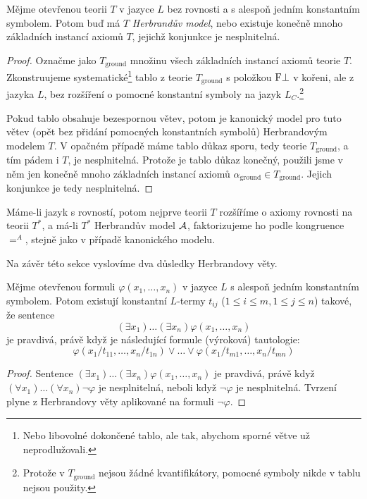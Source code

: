 \begin{theorem}
Mějme otevřenou teorii $T$ v jazyce $L$ bez rovnosti a s alespoň jedním konstantním symbolem. Potom buď má $T$ \emph{Herbrandův model}, nebo existuje konečně mnoho základních instancí axiomů $T$, jejichž konjunkce je nesplnitelná.
\end{theorem}
\begin{proof}
Označme jako $T_\text{ground}$ množinu všech základních instancí axiomů teorie $T$. Zkonstruujeme systematické\footnote{Nebo libovolné dokončené tablo, ale tak, abychom sporné větve už neprodlužovali.} tablo z teorie $T_\text{ground}$ s položkou $\mathrm{F}\bot$ v kořeni, ale z jazyka $L$, bez rozšíření o pomocné konstantní symboly na jazyk $L_C$.\footnote{Protože v $T_\text{ground}$ nejsou žádné kvantifikátory, pomocné symboly nikde v tablu nejsou použity.}

Pokud tablo obsahuje bezespornou větev, potom je kanonický model pro tuto větev (opět bez přidání pomocných konstantních symbolů) Herbrandovým modelem $T$. V opačném případě máme tablo důkaz sporu, tedy teorie $T_\text{ground}$, a tím pádem i $T$, je nesplnitelná. Protože je tablo důkaz konečný, použili jsme v něm jen konečně mnoho základních instancí axiomů $\alpha_\text{ground}\in T_\text{ground}$. Jejich konjunkce je tedy nesplnitelná.
\end{proof}

\begin{remark}
Máme-li jazyk s rovností, potom nejprve teorii $T$ rozšíříme o axiomy rovnosti na teorii $T^*$, a má-li $T^*$ Herbrandův model $\mathcal{A}$, faktorizujeme ho podle kongruence $=^A$, stejně jako v případě kanonického modelu.
\end{remark}

Na závěr této sekce vyslovíme dva důsledky Herbrandovy věty.

\begin{corollary}
    Mějme otevřenou formuli $\varphi(x_1,\dots,x_n)$ v jazyce $L$ s alespoň jedním konstantním symbolem. Potom existují konstantní $L$-termy $t_{ij}$ ($1\leq i\leq m,1\leq j\leq n$) takové, že sentence 
    $$
    (\exists x_1)\dots(\exists x_n)\varphi(x_1,\dots,x_n)$$ 
    je pravdivá, právě když je následující formule (výroková) tautologie:
    $$
    \varphi(x_1/t_{11},\dots,x_n/t_{1n})\lor \dots \lor \varphi(x_1/t_{m1},\dots,x_n/t_{mn})
    $$
\end{corollary}
\begin{proof}
Sentence $(\exists x_1)\dots(\exists x_n)\varphi(x_1,\dots,x_n)$ je pravdivá, právě když $(\forall x_1)\dots(\forall x_n)\neg\varphi$ je nesplnitelná, neboli když $\neg\varphi$ je nesplnitelná. Tvrzení plyne z Herbrandovy věty aplikované na formuli $\neg\varphi$.
\end{proof}

